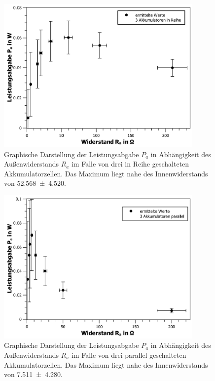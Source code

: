 \begin{figure}[ht]
	\centering
	\includegraphics[width=0.9\textwidth]{auswertung/R-P2.pdf}
	\caption{Graphische Darstellung der Leistungsabgabe $P_a$ in Abhängigkeit des Außenwiderstands $R_a$ im Falle von drei in Reihe geschalteten Akkumulatorzellen. Das Maximum liegt nahe des Innenwiderstands von \SI{52,568+-4,520}{\Omega}.}
	\label{fig:RP2}	
\end{figure}
\begin{figure}[ht]
	\centering
	\includegraphics[width=0.9\textwidth]{auswertung/R-P3.pdf}
	\caption{Graphische Darstellung der Leistungsabgabe $P_a$ in Abhängigkeit des Außenwiderstands $R_a$ im Falle von drei parallel geschalteten Akkumulatorzellen. Das Maximum liegt nahe des Innenwiderstands von \SI{7,511+-4,280}{\Omega}.}
	\label{fig:RP3}	
\end{figure}

